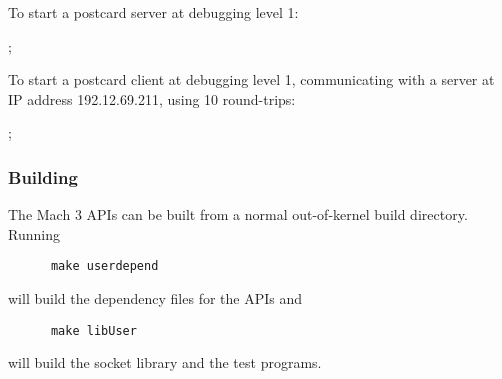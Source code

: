 To start a postcard server at debugging level 1:

;

To start a postcard client at debugging level 1, communicating with a
server at IP address 192.12.69.211, using 10 round-trips:

;


\subsubsection{Building}

The Mach 3 APIs can be built from a normal out-of-kernel \xk{} build
directory.  Running 

\begin{verbatim}
      make userdepend
\end{verbatim}

\noindent
will build the dependency files for the APIs and 

\begin{verbatim}
      make libUser
\end{verbatim}

\noindent
will build the socket library and the test programs.

